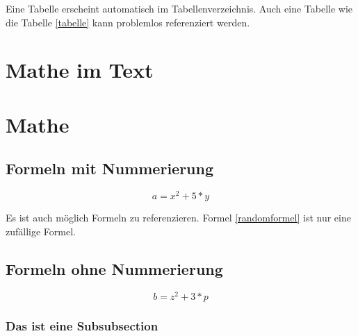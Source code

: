 Eine Tabelle erscheint automatisch im Tabellenverzeichnis. Auch eine Tabelle wie die Tabelle \ref{tabelle} kann problemlos referenziert werden.

\section{Mathe im Text}

\blindmathtrue
\blindtext

\section{Mathe}

\blindmathfalse
\blindmathpaper

\subsection{Formeln mit Nummerierung}

\blindtext

\begin{equation}
	a=x^2+5*y
	\label{randomformel}
\end{equation}

Es ist auch möglich Formeln zu referenzieren. Formel \ref{randomformel} ist nur eine zufällige Formel.

\subsection{Formeln ohne Nummerierung}

\blindtext

\begin{equation*}
	b=z^2+3*p
\end{equation*}

\subsubsection{Das ist eine Subsubsection}

\blindtext